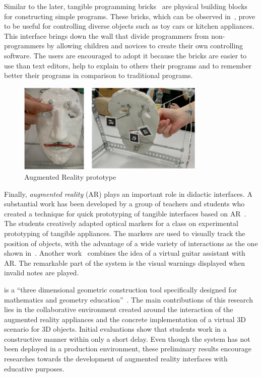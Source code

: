 Similar to the later, tangible programming bricks~\cite{McNerney:2000}
are physical building blocks for constructing simple programs. These
bricks, which can be observed in~, prove to be useful
for controlling diverse objects such as toy cars or kitchen
appliances. This interface brings down the wall that divide
programmers from non\hyp{}programmers by allowing children and novices
to create their own controlling software. The users are encouraged to
adopt it because the bricks are easier to use than text editors, help
to explain to others their programs and to remember better their
programs in comparison to traditional programs.

\begin{figure}
  \centering
  \includegraphics[width=0.8\textwidth]{img/relworks/ar_proto.png}
  \caption{Augmented Reality prototype~\cite{HorneckerPsik:2005}}
  \label{fig:arproto}
\end{figure}

Finally, \emph{augmented reality} (AR) plays an important role in
didactic interfaces. A substantial work has been developed by a group
of teachers and students who created a technique for quick prototyping
of tangible interfaces based on AR~\cite{HorneckerPsik:2005}. The
students creatively adapted optical \artoolkit markers for a class on
experimental prototyping of tangible appliances. The markers are used
to visually track the position of objects, with the advantage of a
wide variety of interactions as the one shown in~.
Another work~\cite{Billinghurst:2002} combines the idea of a virtual
guitar assistant with AR. The remarkable part of the system is the
visual warnings displayed when invalid notes are played.

\constructd is a ``three dimensional geometric construction tool
specifically designed for mathematics and geometry
education''~\cite{KaufmannSchmalstieg:2002}. The main contributions of
this research lies in the collaborative environment created around the
interaction of the augmented reality appliances and the concrete
implementation of a virtual 3D scenario for 3D objects. Initial
evaluations show that students work in a constructive manner within
only a short delay. Even though the system has not been deployed in a
production environment, these preliminary results encourage researches
towards the development of augmented reality interfaces with educative
purposes.
